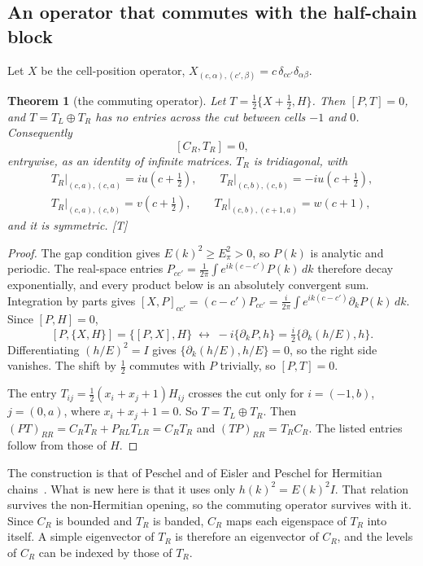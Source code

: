 \documentclass[11pt]{article}
\newtheorem{theorem}{Theorem}[section]
\theoremstyle{definition}
\newcommand{\grade}[1]{\textsf{\small[#1]}}
\begin{document}
\subsection{An operator that commutes with the half-chain block}
Let $X$ be the cell-position operator, $X_{(c,\alpha),(c',\beta)}=c\,\delta_{cc'}\delta_{\alpha\beta}$.
\begin{theorem}[the commuting operator]\label{thm:commute}
Let $T=\tfrac12\{X+\tfrac12,H\}$. Then $[P,T]=0$, and $T=T_L\oplus T_R$ has no entries across the cut between cells $-1$ and $0$. Consequently
\[
[C_R,T_R]=0,
\]
entrywise, as an identity of infinite matrices. $T_R$ is tridiagonal, with
\begin{gather*}
T_R\big|_{(c,a),(c,a)}=iu(c+\tfrac12),\qquad T_R\big|_{(c,b),(c,b)}=-iu(c+\tfrac12),\\
T_R\big|_{(c,a),(c,b)}=v(c+\tfrac12),\qquad T_R\big|_{(c,b),(c+1,a)}=w(c+1),
\end{gather*}
and it is symmetric. \grade{T}
\end{theorem}
\begin{proof}
The gap condition gives $E(k)^2\ge E_\pi^2>0$, so $P(k)$ is analytic and periodic. The real-space entries $P_{cc'}=\frac1{2\pi}\int e^{ik(c-c')}P(k)\,dk$ therefore decay exponentially, and every product below is an absolutely convergent sum. Integration by parts gives $[X,P]_{cc'}=(c-c')P_{cc'}=\frac{i}{2\pi}\int e^{ik(c-c')}\partial_kP(k)\,dk$. Since $[P,H]=0$,
\[
[P,\{X,H\}]=\{[P,X],H\}\;\longleftrightarrow\;-i\{\partial_kP,h\}=\tfrac i2\{\partial_k(h/E),h\}.
\]
Differentiating $(h/E)^2=I$ gives $\{\partial_k(h/E),h/E\}=0$, so the right side vanishes. The shift by $\tfrac12$ commutes with $P$ trivially, so $[P,T]=0$.

The entry $T_{ij}=\tfrac12(x_i+x_j+1)H_{ij}$ crosses the cut only for $i=(-1,b)$, $j=(0,a)$, where $x_i+x_j+1=0$. So $T=T_L\oplus T_R$. Then $(PT)_{RR}=C_RT_R+P_{RL}T_{LR}=C_RT_R$ and $(TP)_{RR}=T_RC_R$. The listed entries follow from those of $H$.
\end{proof}
The construction is that of Peschel and of Eisler and Peschel for Hermitian chains~\cite{peschel03,peschel04,eislerpeschel13,eislerpeschel17}. What is new here is that it uses only $h(k)^2=E(k)^2I$. That relation survives the non-Hermitian opening, so the commuting operator survives with it. Since $C_R$ is bounded and $T_R$ is banded, $C_R$ maps each eigenspace of $T_R$ into itself. A simple eigenvector of $T_R$ is therefore an eigenvector of $C_R$, and the levels of $C_R$ can be indexed by those of $T_R$.
\end{document}
